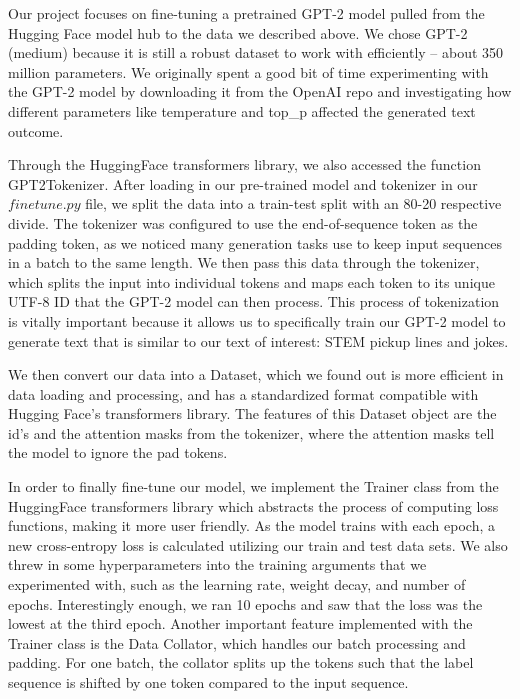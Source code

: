 \documentclass[12pt,reqno]{amsart}
\theoremstyle{plain}
\theoremstyle{definition}
\theoremstyle{remark}
\begin{document}
Our project focuses on fine-tuning a pretrained GPT-2 model pulled from the Hugging Face model hub to the data we described above. We chose GPT-2 (medium) because it is still a robust dataset to work with efficiently – about 350 million parameters. We originally spent a good bit of time experimenting with the GPT-2 model by downloading it from the OpenAI repo and investigating how different parameters like temperature and top\_p affected the generated text outcome.

Through the HuggingFace transformers library, we also accessed the function GPT2Tokenizer. After loading in our pre-trained model and tokenizer in our $finetune.py$ file, we split the data into a train-test split with an 80-20 respective divide. The tokenizer was configured to use the end-of-sequence token as the padding token, as we noticed many generation tasks use to keep input sequences in a batch to the same length. We then pass this data through the tokenizer, which splits the input into individual tokens and maps each token to its unique UTF-8 ID that the GPT-2 model can then process. This process of tokenization is vitally important because it allows us to specifically train our GPT-2 model to generate text that is similar to our text of interest: STEM pickup lines and jokes. 

We then convert our data into a Dataset, which we found out is more efficient in data loading and processing, and has a standardized format compatible with Hugging Face's transformers library. The features of this Dataset object are the id's and the attention masks from the tokenizer, where the attention masks tell the model to ignore the pad tokens.

In order to finally fine-tune our model, we implement the Trainer class from the HuggingFace transformers library which abstracts the process of computing loss functions, making it more user friendly. As the model trains with each epoch, a new cross-entropy loss is calculated utilizing our train and test data sets. We also threw in some hyperparameters into the training arguments that we experimented with, such as the learning rate, weight decay, and number of epochs. Interestingly enough, we ran 10 epochs and saw that the loss was the lowest at the third epoch. Another important feature implemented with the Trainer class is the Data Collator, which handles our batch processing and padding. For one batch, the collator splits up the tokens such that the label sequence is shifted by one token compared to the input sequence. 
\end{document}
